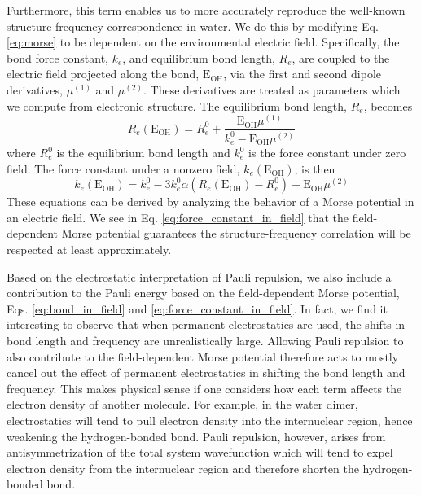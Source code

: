 \documentclass[journal=jctcce,manuscript=article]{achemso}
\begin{document}
Furthermore, this term enables us to more accurately reproduce the well-known structure-frequency correspondence in water.\cite{boyer2019beyond} We do this by modifying Eq. \ref{eq:morse} to be dependent on the environmental electric field. Specifically, the bond force constant, $k_e$, and equilibrium bond length, $R_e$, are coupled to the electric field projected along the bond, $\mathrm{E_{OH}}$, via the first and second dipole derivatives, $\mu^{(1)}$ and $\mu^{(2)}$. These derivatives are treated as parameters which we compute from electronic structure. The equilibrium bond length, $R_e$, becomes
\begin{equation}
  R_e(\mathrm{E_{OH}})=R_e^0+ \frac{\mathrm{E_{OH}}\mu^{(1)}}{k_e^0-\mathrm{E_{OH}}\mu^{(2)}}
  \label{eq:bond_in_field}
\end{equation}
where $R_e^0$ is the equilibrium bond length and $k_e^0$ is the force constant under zero field. The force constant under a nonzero field, $k_e(\mathrm{E_{OH}})$, is then
\begin{equation}
  k_e(\mathrm{E_{OH}})=k_e^0-3k_e^0\alpha\left(R_e(\mathrm{E_{OH}})-R_e^0\right)-\mathrm{E_{OH}}\mu^{(2)}
  \label{eq:force_constant_in_field}
\end{equation}
These equations can be derived by analyzing the behavior of a Morse potential in an electric field.\cite{boyer2019beyond} We see in Eq. \ref{eq:force_constant_in_field} that the field-dependent Morse potential guarantees the structure-frequency correlation will be respected at least approximately.

Based on the electrostatic interpretation of Pauli repulsion, we also include a contribution to the Pauli energy based on the field-dependent Morse potential, Eqs. \ref{eq:bond_in_field} and \ref{eq:force_constant_in_field}. In fact, we find it interesting to observe that when permanent electrostatics are used, the shifts in bond length and frequency are unrealistically large. Allowing Pauli repulsion to also contribute to the field-dependent Morse potential therefore acts to mostly cancel out the effect of permanent electrostatics in shifting the bond length and frequency. This makes physical sense if one considers how each term affects the electron density of another molecule. For example, in the water dimer, electrostatics will tend to pull electron density into the internuclear region, hence weakening the hydrogen-bonded  bond. Pauli repulsion, however, arises from antisymmetrization of the total system wavefunction which will tend to expel electron density from the internuclear region and therefore shorten the hydrogen-bonded  bond.
\end{document}
